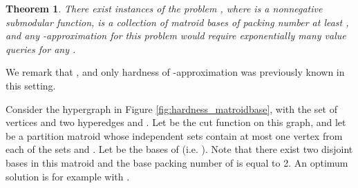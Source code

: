 \documentclass{article}[11pt]
\newtheorem{theorem}{Theorem}[section]
\begin{document}
\begin{theorem}
\label{thm:hard_matroidbase}
There exist instances of the problem ,
where  is a nonnegative submodular function,  is a collection of matroid bases
of packing number at least , and any -approximation
for this problem would require exponentially many value queries for any .
\end{theorem}

We remark that , and only hardness of -approximation
was previously known in this setting. 

\medskip
{}
Consider the hypergraph in Figure \ref{fig:hardness_matroidbase},
with the set of vertices  and two hyperedges  and
. Let  be the cut function on this graph,
and let  be a partition matroid whose independent sets contain at most
one vertex from each of the sets  and . Let  be the bases of 
(i.e. ).
Note that there exist two disjoint bases in this matroid
and the base packing number of  is equal to 2.  
An optimum solution is for example  with . 
\end{document}
